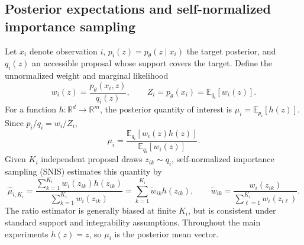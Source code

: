 \documentclass[10pt,letterpaper]{article}
\newcommand{\E}{\mathbb E}
\newcommand{\R}{\mathbb R}
\begin{document}
\subsection{Posterior expectations and self-normalized importance sampling}
Let $x_i$ denote observation $i$, $p_i(z)=p_\theta(z\mid x_i)$ the target posterior, and $q_i(z)$ an accessible proposal whose support covers the target. Define the unnormalized weight and marginal likelihood
\begin{equation}
 w_i(z)=\frac{p_\theta(x_i,z)}{q_i(z)},\qquad Z_i=p_\theta(x_i)=\E_{q_i}[w_i(z)].
 \label{eq:weights}
\end{equation}
For a function $h:\R^d\to\R^m$, the posterior quantity of interest is $\mu_i=\E_{p_i}[h(z)]$. Since $p_i/q_i=w_i/Z_i$,
\begin{equation}
 \mu_i=\frac{\E_{q_i}[w_i(z)h(z)]}{\E_{q_i}[w_i(z)]}.
\end{equation}
Given $K_i$ independent proposal draws $z_{ik}\sim q_i$, self-normalized importance sampling (SNIS) estimates this quantity by
\begin{equation}
 \widehat\mu_{i,K_i}=\frac{\sum_{k=1}^{K_i}w_i(z_{ik})h(z_{ik})}{\sum_{k=1}^{K_i}w_i(z_{ik})}
 =\sum_{k=1}^{K_i}\widetilde w_{ik}h(z_{ik}),\qquad
 \widetilde w_{ik}=\frac{w_i(z_{ik})}{\sum_{\ell=1}^{K_i}w_i(z_{i\ell})}.
 \label{eq:snis}
\end{equation}
The ratio estimator is generally biased at finite $K_i$, but is consistent under standard support and integrability assumptions. Throughout the main experiments $h(z)=z$, so $\mu_i$ is the posterior mean vector.
\end{document}
